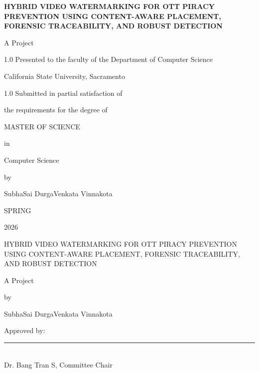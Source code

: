 \documentclass[12pt,oneside]{report}
\newcommand{\ReportTitle}{HYBRID VIDEO WATERMARKING FOR OTT PIRACY PREVENTION USING CONTENT-AWARE PLACEMENT, FORENSIC TRACEABILITY, AND ROBUST DETECTION}
\newcommand{\StudentName}{SubhaSai DurgaVenkata Vinnakota}
\newcommand{\DegreeName}{MASTER OF SCIENCE}
\newcommand{\MajorName}{Computer Science}
\newcommand{\DepartmentName}{Computer Science}
\newcommand{\TermName}{SPRING}
\newcommand{\TermYear}{2026}
\newcommand{\CommitteeChair}{Dr. Bang Tran S}
\begin{document}

\begin{titlepage}
\thispagestyle{empty}
\begin{center}
\vspace*{0.4in}
{\Large\bfseries \ReportTitle\par}
\vspace{1.4in}
A Project\par
\vspace{1.2in}
\begin{spacing}{1.0}
Presented to the faculty of the Department of \DepartmentName\par
California State University, Sacramento\par
\end{spacing}
\vspace{1.2in}
\begin{spacing}{1.0}
Submitted in partial satisfaction of\par
the requirements for the degree of\par
\end{spacing}
\vspace{0.6in}
{\large \DegreeName\par}
\vspace{0.5in}
in\par
\vspace{0.3in}
{\large \MajorName\par}
\vspace{1.1in}
by\par
\vspace{0.5in}
{\large \StudentName\par}
\vfill
\TermName\par
\TermYear
\end{center}
\end{titlepage}

\clearpage
\thispagestyle{empty}
\begin{center}
\ReportTitle
\vspace{1.0in}

A Project
\vspace{1.0in}

by
\vspace{1.0in}

\StudentName
\end{center}
\vspace{1.2in}
\noindent
Approved by:

\vspace{1.0in}
\noindent
\rule{4.5in}{0.4pt}\\
{\CommitteeChair, Committee Chair}
\end{document}
